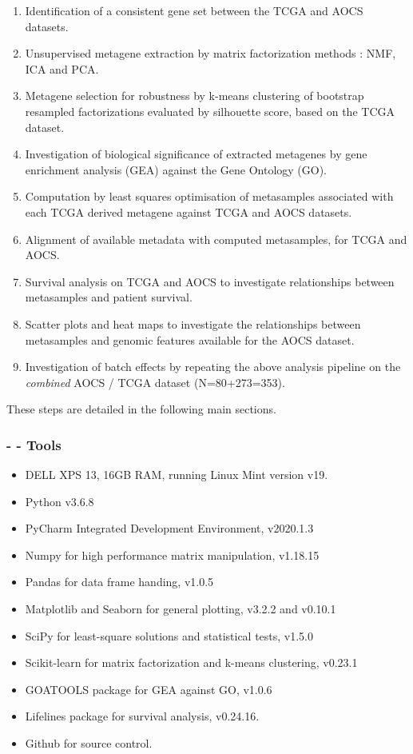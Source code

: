 \documentclass[tikz, 11pt,a4paper,oneside,fleqn, draft]{article}
\begin{document}
\begin{enumerate}
\item
Identification of a consistent gene set between the TCGA and AOCS datasets.
\item
Unsupervised metagene extraction by matrix factorization methods : NMF, ICA and PCA.
\item
Metagene selection for robustness by k-means clustering of bootstrap resampled factorizations evaluated by silhouette score, based on the TCGA dataset.
\item
Investigation of biological significance of extracted metagenes by gene enrichment analysis (GEA) against the Gene Ontology (GO).
\item
Computation by least squares optimisation of metasamples associated with each TCGA derived metagene against TCGA and AOCS datasets.
\item
Alignment of available metadata with computed metasamples, for TCGA and AOCS.
\item 
Survival analysis on TCGA and AOCS to investigate relationships between metasamples and patient survival.
\item
Scatter plots and heat maps to investigate the relationships between metasamples and genomic features available for the AOCS dataset.
\item
Investigation of batch effects by repeating the above analysis pipeline on the \emph{combined} AOCS / TCGA dataset (N=80+273=353).

\end{enumerate}

These steps are detailed in the following main sections.

\FloatBarrier

\subsubsection{- - Tools}
\begin{itemize}
\itemsep -0.5em 
\item DELL XPS 13, 16GB RAM, running Linux Mint version v19.
\item Python v3.6.8
\item PyCharm Integrated Development Environment, v2020.1.3
\item Numpy for high performance matrix manipulation, v1.18.15
\item Pandas for data frame handing, v1.0.5
\item Matplotlib and Seaborn for general plotting, v3.2.2 and v0.10.1
\item SciPy for least-square solutions and statistical tests, v1.5.0
\item Scikit-learn for matrix factorization and k-means clustering, v0.23.1
\item GOATOOLS package for GEA against GO, v1.0.6
\item Lifelines package for survival analysis, v0.24.16.
\item Github for source control.
\end{itemize}
\end{document}
